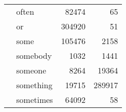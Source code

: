\begin{longtable}[ht]{llrr}
 & often & {\cellcolor[HTML]{BBE4B5}} \color[HTML]{000000} 82474 & {\cellcolor[HTML]{FFFFD9}} \color[HTML]{000000} 65 \\
 & or & {\cellcolor[HTML]{081D58}} \color[HTML]{F1F1F1} 304920 & {\cellcolor[HTML]{FFFFD9}} \color[HTML]{000000} 51 \\
 & some & {\cellcolor[HTML]{90D4B9}} \color[HTML]{000000} 105476 & {\cellcolor[HTML]{FEFFD8}} \color[HTML]{000000} 2158 \\
 & somebody & {\cellcolor[HTML]{FFFFD9}} \color[HTML]{000000} 1032 & {\cellcolor[HTML]{FEFFD8}} \color[HTML]{000000} 1441 \\
 & someone & {\cellcolor[HTML]{FCFED1}} \color[HTML]{000000} 8264 & {\cellcolor[HTML]{F5FBC4}} \color[HTML]{000000} 19364 \\
 & something & {\cellcolor[HTML]{F6FBC5}} \color[HTML]{000000} 19715 & {\cellcolor[HTML]{081D58}} \color[HTML]{F1F1F1} 289917 \\
 & sometimes & {\cellcolor[HTML]{D4EEB3}} \color[HTML]{000000} 64092 & {\cellcolor[HTML]{FFFFD9}} \color[HTML]{000000} 58 \\
\cline{1-4}
\end{longtable}
